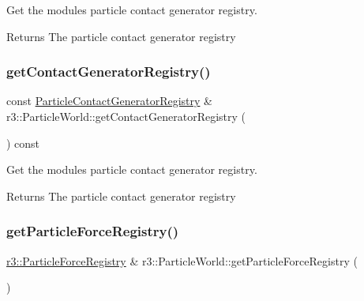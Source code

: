 Get the module\textquotesingle{}s particle contact generator registry. 

\begin{DoxyReturn}{Returns}
The particle contact generator registry 
\end{DoxyReturn}
\mbox{\label{classr3_1_1_particle_world_ab5cd3adaed73294927de72f3293b0709}} 
\subsubsection{\texorpdfstring{get\+Contact\+Generator\+Registry()}{getContactGeneratorRegistry()}\hspace{0.1cm}{\footnotesize\ttfamily [2/2]}}
{\footnotesize\ttfamily const \mbox{\hyperlink{classr3_1_1_particle_contact_generator_registry}{Particle\+Contact\+Generator\+Registry}} \& r3\+::\+Particle\+World\+::get\+Contact\+Generator\+Registry (\begin{DoxyParamCaption}{ }\end{DoxyParamCaption}) const}



Get the module\textquotesingle{}s particle contact generator registry. 

\begin{DoxyReturn}{Returns}
The particle contact generator registry 
\end{DoxyReturn}
\mbox{\label{classr3_1_1_particle_world_aaa3f952fdfd8862673d41afa078245bf}} 
\subsubsection{\texorpdfstring{get\+Particle\+Force\+Registry()}{getParticleForceRegistry()}\hspace{0.1cm}{\footnotesize\ttfamily [1/2]}}
{\footnotesize\ttfamily \mbox{\hyperlink{classr3_1_1_particle_force_registry}{r3\+::\+Particle\+Force\+Registry}} \& r3\+::\+Particle\+World\+::get\+Particle\+Force\+Registry (\begin{DoxyParamCaption}{ }\end{DoxyParamCaption})}



